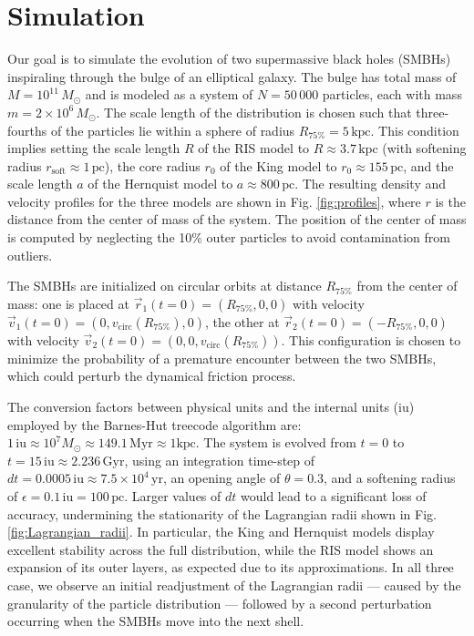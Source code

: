 \documentclass[fleqn,usenatbib]{mnras}
\begin{document}
\section{Simulation}\label{sec:simulation}
Our goal is to simulate the evolution of two supermassive black holes (SMBHs) inspiraling through the bulge of an elliptical galaxy. 
The bulge has total mass of $M=10^{11} \,M_\odot$ and is modeled as a system of $N=50\,000$ particles, each with mass $m=2 \times 10^6 \,M_\odot$.
The scale length of the distribution is chosen such that three-fourths of the particles lie within a sphere of radius $R_{75\%} = 5 \,\text{kpc}$.
This condition implies setting the scale length $R$ of the RIS model to $R \approx 3.7 \,\text{kpc}$ (with softening radius $r_\text{soft} \approx 1 \,\text{pc}$), the core radius $r_0$ of the King model to $r_0 \approx 155 \,\text{pc}$, and the scale length $a$ of the Hernquist model to $a \approx 800 \,\text{pc}$.
The resulting density and velocity profiles for the three models are shown in Fig. \ref{fig:profiles}, where $r$ is the distance from the center of mass of the system. 
The position of the center of mass is computed by neglecting the 10\% outer particles to avoid contamination from outliers.
\vspace{0.5em}

The SMBHs are initialized on circular orbits at distance $R_{75\%}$ from the center of mass: one is placed at $\vec{r}_1 (t=0) = (R_{75\%}, 0, 0)$ with velocity $\vec{v}_1 (t=0) = (0, v_\text{circ}(R_{75\%}), 0)$, the other at $\vec{r}_2 (t=0) = (-R_{75\%}, 0, 0)$ with velocity $\vec{v}_2 (t=0) = (0, 0, v_\text{circ}(R_{75\%}))$.
This configuration is chosen to minimize the probability of a premature encounter between the two SMBHs, which could perturb the dynamical friction process.
\vspace{0.5em}

The conversion factors between physical units and the internal units (iu) employed by the Barnes-Hut treecode algorithm are: $1 \,\text{iu} \approx 10^7 M_\odot \approx 149.1 \,\text{Myr} \approx 1 \text{kpc}$.
The system is evolved from $t=0$ to $t=15 \,\text{iu} \approx 2.236 \,\text{Gyr}$, using an integration time-step of $dt = 0.0005 \,\text{iu} \approx 7.5 \times 10^4 \,\text{yr}$, an opening angle of $\theta=0.3$, and a softening radius of $\epsilon=0.1 \,\text{iu} = 100 \,\text{pc}$.
Larger values of $dt$ would lead to a significant loss of accuracy, undermining the stationarity of the Lagrangian radii shown in Fig. \ref{fig:Lagrangian_radii}.
In particular, the King and Hernquist models display excellent stability across the full distribution, while the RIS model shows an expansion of its outer layers, as expected due to its approximations.
In all three case, we observe an initial readjustment of the Lagrangian radii — caused by the granularity of the particle distribution — followed by a second perturbation occurring when the SMBHs move into the next shell.
\end{document}
